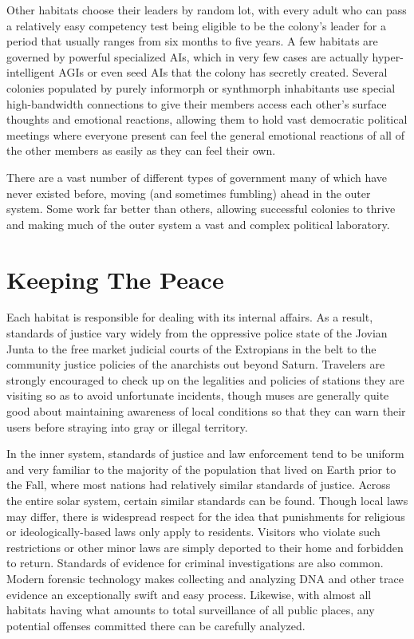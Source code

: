 Other habitats choose their leaders by random 
lot, with every adult who can pass a relatively easy 
competency test being eligible to be the colony's 
leader for a period that usually ranges from six 
months to five years. A few habitats are governed 
by powerful specialized AIs, which in very few 
cases are actually hyper-intelligent AGIs or even 
seed AIs that the colony has secretly created. Several
colonies populated by purely informorph or
synthmorph inhabitants use special high-bandwidth 
connections to give their members access each 
other's surface thoughts and emotional reactions, 
allowing them to hold vast democratic political 
meetings where everyone present can feel the general
emotional reactions of all of the other members
as easily as they can feel their own.

There are a vast number of different types of government
many of which have never existed before,
moving (and sometimes fumbling) ahead in the outer 
system. Some work far better than others, allowing 
successful colonies to thrive and making much of the 
outer system a vast and complex political laboratory.

\section{Keeping The Peace}

Each habitat is responsible for dealing with its internal
affairs. As a result, standards of justice vary
widely from the oppressive police state of the Jovian 
Junta to the free market judicial courts of the Extropians
in the belt to the community justice policies
of the anarchists out beyond Saturn. Travelers are 
strongly encouraged to check up on the legalities and 
policies of stations they are visiting so as to avoid 
unfortunate incidents, though muses are generally 
quite good about maintaining awareness of local 
conditions so that they can warn their users before 
straying into gray or illegal territory.

In the inner system, standards of justice and law enforcement
tend to be uniform and very familiar to the
majority of the population that lived on Earth prior 
to the Fall, where most nations had relatively similar 
standards of justice. Across the entire solar system, 
certain similar standards can be found. Though local 
laws may differ, there is widespread respect for the 
idea that punishments for religious or ideologically-based
laws only apply to residents. Visitors who violate
such restrictions or other minor laws are simply
deported to their home and forbidden to return. 
Standards of evidence for criminal investigations are 
also common. Modern forensic technology makes collecting
and analyzing DNA and other trace evidence
an exceptionally swift and easy process. Likewise, 
with almost all habitats having what amounts to total 
surveillance of all public places, any potential offenses 
committed there can be carefully analyzed.

